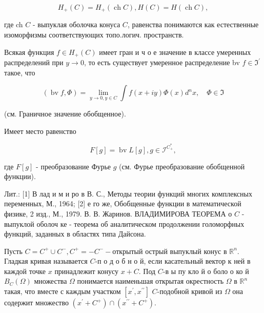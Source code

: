 \documentclass[10pt]{article}
\begin{document}
\[

H_{+}(C)=H_{+}(\operatorname{ch} C), H(C)=H(\operatorname{ch} C),

\]



где ch $C$ - выпуклая оболочка конуса $C$, равенства понимаются как естественные изоморфизмы соответствующих топо.логич. пространств.



Всякая функция $f \in H_{+}(C)$ имеет гран и ч о е значение в классе умеренных распределений при $y \rightarrow 0$, то есть существует умеренное распределение bv $f \in \mathfrak{I}^{\prime}$ такое, что



\[

(\operatorname{bv} f, \Phi)=\lim _{y \rightarrow 0, y \in C} \int f(x+i y) \Phi(x) d^{n} x, \quad \Phi \in \mathfrak{I}

\]



(см. Граничное значение обобщенное).



Имеет место равенство



\[

F[g]=\operatorname{bv} L[g], g \in \mathscr{I}^{C_{+}^{*}},

\]



где $F[g]$ - преобразование Фурье $g$ (см. Фурье преобразование обобщенной функции).



Лит.: [1] В лад и м и ро в В. С., Методы теории функций многих комплексных переменных, М., 1964; [2] е го же, Обобщенные функции в математической физике, 2 изд., М., 1979. В. В. Жаринов. ВЛАДИМИРОВА ТЕОРЕМА о $C$ - выпуклой оболоч ке - теорема об аналитическом продолжении голоморфных функций, заданных в областях типа Дайсона.



Пусть $C=C^{+} \cup C^{-}, C^{+}=-C^{-}-$открытый острый выпуклый конус в $\mathbb{R}^{n}$. Гладкая кривая называется $C$-п о д о б н о й, если касательный вектор к ней в каждой точке $x$ принадлежит конусу $x+C$. Под $C$-в ы пу кло й о боло о ко й $B_{C}(\Omega)$ множества $\Omega$ понимается наименьшая открытая окрестность $\Omega$ в $\mathbb{R}^{n}$ такая, что вместе с каждым участком $\left[x^{\prime}, x^{\prime \prime}\right]$ $C$-подобной кривой из $\Omega$ она содержит множество $\left(x^{\prime}+C^{+}\right) \cap\left(x^{\prime \prime}+C^{+}\right)$.
\end{document}
